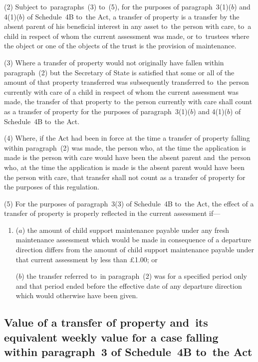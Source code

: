 \documentclass[12pt,a4paper]{article}
\begin{document}
(2) Subject to~paragraphs~(3) to~(5), for the purposes of paragraph~3(1)($b$) and
4(1)($b$) of Schedule~4B to~the Act, a transfer of property is a transfer by the
absent parent of his beneficial interest in any asset to~the person with care,
to~a child in respect of whom the current assessment was made, or to~trustees
where the object or one of the objects of the trust is the provision of
maintenance.

(3) Where a transfer of property would not originally have fallen within
paragraph~(2) but the Secretary of State is satisfied that some or all of the
amount of that property transferred was subsequently transferred to~the person
currently with care of a child in respect of whom the current assessment was
made, the transfer of that property to~the person currently with care shall
count as a transfer of property for the purposes of paragraph~3(1)($b$) and
4(1)($b$) of Schedule~4B to~the Act.

(4) Where, if the Act had been in force at the time a transfer of property
falling within paragraph~(2) was made, the person who, at the time the
application is made is the person with care would have been the absent parent
and~the person who, at the time the application is made is the absent parent
would have been the person with care, that transfer shall not count as a
transfer of property for the purposes of this regulation.

(5) For the purposes of paragraph~3(3) of Schedule~4B to~the Act, the effect of
a transfer of property is properly reflected in the current assessment if—
\begin{enumerate}\item[]
($a$) the amount of child support maintenance payable under any fresh maintenance
assessment which would be made in consequence of a departure direction differs
from the amount of child support maintenance payable under that current
assessment by less than £1.00; or

($b$) the transfer referred to~in paragraph~(2) was for a specified period only and
that period ended before the effective date of any departure direction which
would otherwise have been given.
\end{enumerate}

\subsection[22. Value of a transfer of property and~its equivalent weekly value for a case
falling within paragraph~3 of Schedule~4B to~the Act]{Value of a transfer of property and~its equivalent weekly value for a case
falling within paragraph~3 of Schedule~4B to~the Act}
\end{document}
